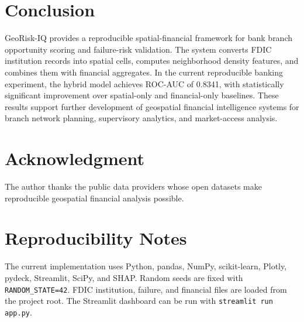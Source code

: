 \documentclass[conference]{IEEEtran}
\begin{document}
\section{Conclusion}
GeoRisk-IQ provides a reproducible spatial-financial framework for bank
branch opportunity scoring and failure-risk validation. The system converts
FDIC institution records into spatial cells, computes neighborhood density
features, and combines them with financial aggregates. In the current
reproducible banking experiment, the hybrid model achieves ROC-AUC of
0.8341, with statistically significant improvement over spatial-only and
financial-only baselines. These results support further development of
geospatial financial intelligence systems for branch network planning,
supervisory analytics, and market-access analysis.

\section*{Acknowledgment}
The author thanks the public data providers whose open datasets make
reproducible geospatial financial analysis possible.

\appendix
\section{Reproducibility Notes}
The current implementation uses Python, pandas, NumPy, scikit-learn,
Plotly, pydeck, Streamlit, SciPy, and SHAP. Random seeds are fixed with
\texttt{RANDOM\_STATE=42}. FDIC institution, failure, and financial files
are loaded from the project root. The Streamlit dashboard can be run with
\texttt{streamlit run app.py}.
\end{document}
